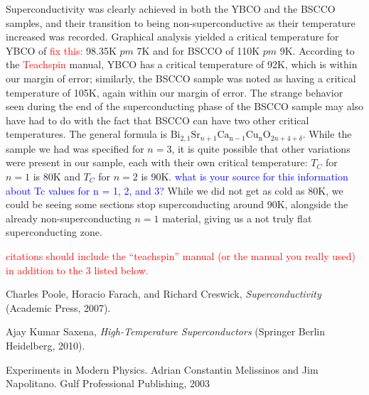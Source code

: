 \documentclass[prb,preprint]{revtex4-1}
\begin{document}
Superconductivity was clearly achieved in both the YBCO and the BSCCO samples, and their transition to being non-superconductive as their temperature increased was recorded. Graphical analysis yielded a critical temperature for YBCO of \textcolor{red}{fix this:} 98.35K $pm$ 7K and for BSCCO of 110K $pm$ 9K. According to the \textcolor{red}{Teachspin} manual, YBCO has a critical temperature of 92K, which is within our margin of error; similarly, the BSCCO sample was noted as having a critical temperature of 105K, again within our margin of error. The strange behavior seen during the end of the superconducting phase of the BSCCO sample may also have had to do with the fact that BSCCO can have two other critical temperatures. The general formula is $\textrm{Bi}_{2,1}\textrm{Sr}_{n+1}\textrm{Ca}_{\textrm{n}-1}\textrm{Cu}_{\textrm{n}}\textrm{O}_{2n+4+\delta}$. While the sample we had was specified for $n=3$, it is quite possible that other variations were present in our sample, each with their own critical temperature: $T_C$ for $n=1$ is 80K and $T_C$ for $n=2$ is 90K. \textcolor{blue}{what is your source for this information about Tc values for n  = 1, 2, and 3?} While we did not get as cold as 80K, we could be seeing some sections stop superconducting around 90K, alongside the already non-superconducting $n=1$ material, giving us a not truly flat superconducting zone.

\textcolor{red}{citations should include the ``teachspin'' manual (or the manual you really used) in addition to the 3 listed below. }


\begin{thebibliography}{99}

 Charles Poole, Horacio Farach, and Richard Creswick, \textit{Superconductivity} (Academic Press, 2007).

 Ajay Kumar Saxena, \textit{High-Temperature Superconductors} (Springer Berlin Heidelberg, 2010).


 Experiments in Modern Physics.  Adrian Constantin Melissinos and Jim Napolitano.  Gulf Professional Publishing, 2003



\end{thebibliography}
\end{document}
